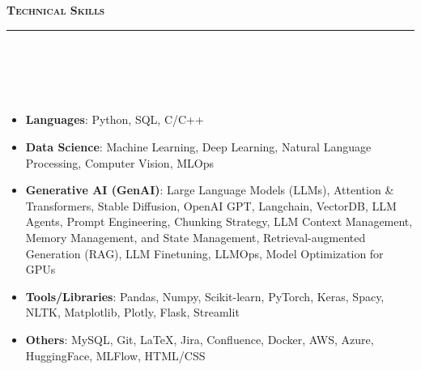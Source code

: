 \documentclass[a4paper,10pt]{article}
\newcommand{\lsep}{-0.5cm}
\newcommand{\resheading}[1]{{\small
        {
            \begin{minipage}
                {0.992\textwidth}\textbf{{\textsc{#1 \vphantom{p\^{E}} }}}
                \\[-0.3cm]
                \hrule
            \end{minipage}
            \\[-0.5cm]
        }
 }}
\begin{document}
\vspace{2pt}
\noindent
\resheading{\textbf{\large Technical Skills}}\\[\lsep] 
\\[-0.3cm]
\begin{itemize}
  \item \textbf{Languages}: Python, SQL, C/C++\\[-0.6cm]
  \item \textbf{Data Science}: Machine Learning, Deep Learning, Natural Language Processing, Computer Vision, MLOps  \\[-0.6cm]
  \item \textbf{Generative AI (GenAI)}: Large Language Models (LLMs), Attention \& Transformers, Stable Diffusion, OpenAI GPT, Langchain, VectorDB, LLM Agents, Prompt Engineering, Chunking Strategy, LLM Context Management, \\Memory Management, and State Management, Retrieval-augmented Generation (RAG), LLM Finetuning, LLMOps, Model Optimization for GPUs \\[-0.6cm]
  \item \textbf{Tools/Libraries}: Pandas, Numpy, Scikit-learn, PyTorch, Keras, Spacy, NLTK, Matplotlib, Plotly, Flask, Streamlit \\[-0.6cm]
  \item \textbf{Others}: MySQL, Git, LaTeX, Jira, Confluence, Docker, AWS, Azure, HuggingFace, MLFlow, HTML/CSS\\[-0.5cm]
\end{itemize}

\end{document}
